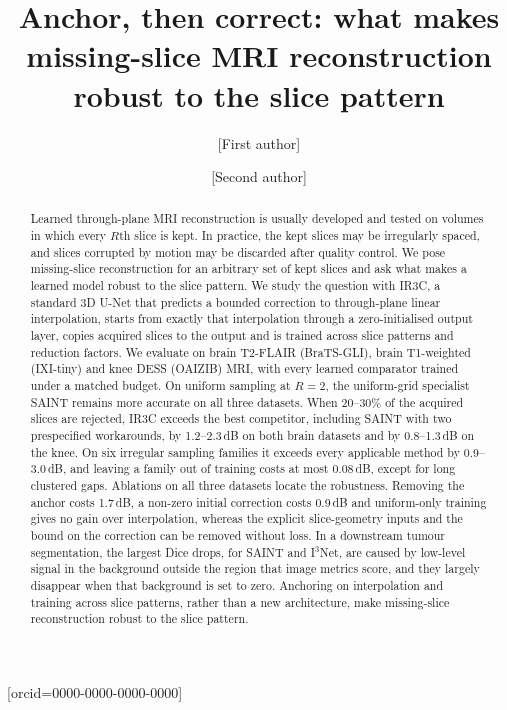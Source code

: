\documentclass[a4paper,fleqn]{cas-dc}
\begin{document}
\let\WriteBookmarks\relax
\def\floatpagepagefraction{1}
\def\textpagefraction{.001}

\shortauthors{[Authors]}

\title[mode=title]{Anchor, then correct: what makes missing-slice MRI reconstruction
robust to the slice pattern}

\author[1]{[First author]}[orcid=0000-0000-0000-0000]
\cormark[1]
\ead{[email]}

\author[1]{[Second author]}


\begin{abstract}
Learned through-plane MRI reconstruction is usually developed and tested on volumes in which
every $R$th slice is kept. In practice, the kept slices may be irregularly spaced, and slices
corrupted by motion may be discarded after quality control. We pose missing-slice
reconstruction for an arbitrary set of kept slices and ask what makes a learned model robust
to the slice pattern. We study the question with IR3C, a standard 3D U-Net that predicts a
bounded correction to through-plane linear interpolation, starts from exactly that
interpolation through a zero-initialised output layer, copies acquired slices to the output
and is trained across slice patterns and reduction factors. We evaluate on brain T2-FLAIR
(BraTS-GLI), brain T1-weighted (IXI-tiny) and knee DESS (OAIZIB) MRI, with every learned
comparator trained under a matched budget. On uniform sampling at $R=2$, the uniform-grid
specialist SAINT remains more accurate on all three datasets. When 20--30\% of the acquired
slices are rejected, IR3C exceeds the best competitor, including SAINT with two prespecified
workarounds, by 1.2--2.3\,dB on both brain datasets and by 0.8--1.3\,dB on the knee. On six
irregular sampling families it exceeds every applicable method by 0.9--3.0\,dB, and leaving a
family out of training costs at most 0.08\,dB, except for long clustered gaps. Ablations on
all three datasets locate the robustness. Removing the anchor costs 1.7\,dB, a non-zero
initial correction costs 0.9\,dB and uniform-only training gives no gain over interpolation,
whereas the explicit slice-geometry inputs and the bound on the correction can be removed
without loss. In a downstream tumour segmentation, the largest Dice drops, for SAINT and
I$^3$Net, are caused by low-level signal in the background outside the region that image
metrics score, and they largely disappear when that background is set to zero. Anchoring on
interpolation and training across slice patterns, rather than a new architecture, make
missing-slice reconstruction robust to the slice pattern.
\end{abstract}
\end{document}
